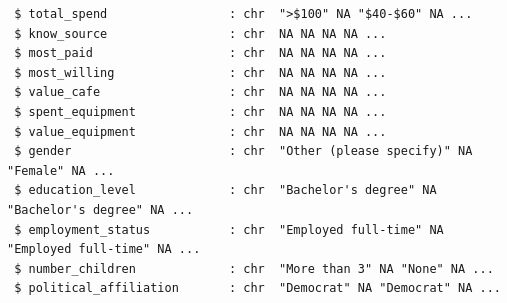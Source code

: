 \documentclass[
  letterpaper,
  DIV=11,
  numbers=noendperiod]{scrartcl}
\begin{document}
\begin{verbatim}
 $ total_spend                 : chr  ">$100" NA "$40-$60" NA ...
 $ know_source                 : chr  NA NA NA NA ...
 $ most_paid                   : chr  NA NA NA NA ...
 $ most_willing                : chr  NA NA NA NA ...
 $ value_cafe                  : chr  NA NA NA NA ...
 $ spent_equipment             : chr  NA NA NA NA ...
 $ value_equipment             : chr  NA NA NA NA ...
 $ gender                      : chr  "Other (please specify)" NA "Female" NA ...
 $ education_level             : chr  "Bachelor's degree" NA "Bachelor's degree" NA ...
 $ employment_status           : chr  "Employed full-time" NA "Employed full-time" NA ...
 $ number_children             : chr  "More than 3" NA "None" NA ...
 $ political_affiliation       : chr  "Democrat" NA "Democrat" NA ...
\end{verbatim}
\end{document}
